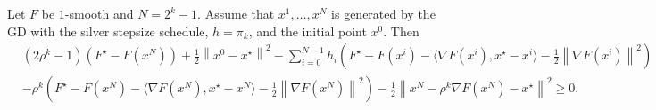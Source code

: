 \documentclass[10pt,a4paper]{amsart}
\newcommand{\f}[1]{F(x^{#1})}
\newcommand{\g}[1]{\nabla F(x^{#1})}
\begin{document}
\begin{lemma}\label{lemma}
Let  $F$ be $1$-smooth and $N=2^k-1$. Assume that $x^1, \dots, x^N$ is generated by the GD with the silver stepsize schedule, $h=\pi_k$, and the initial point $x^0$. Then
\begin{align}\label{M.I}
\nonumber & \left(2\rho^k-1\right)\left(F^\star-\f{N}\right)
+\tfrac{1}{2}\left\|x^0-x^\star\right\|^2
-\sum_{i=0}^{N-1}h_i\left(  F^\star-\f{i}-\langle \g{i}, x^\star-x^i\rangle-\tfrac{1}{2}\left\| \g{i} \right\|^2 \right)\\
& -\rho^k\left(  F^\star-\f{N}-\langle \g{N}, x^\star-x^N\rangle-\tfrac{1}{2}\left\| \g{N}\right\|^2 \right)
-\tfrac{1}{2}\left\| x^{N}-\rho^k \g{N}-x^\star\right\|^2 \geq 0.
\end{align} 
\end{lemma}
\end{document}
